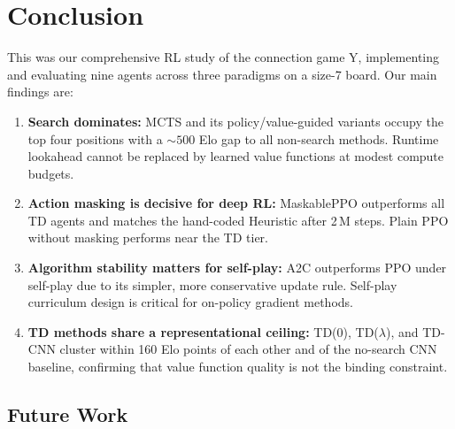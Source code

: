 \documentclass[conference]{IEEEtran}
\begin{document}
\section{Conclusion}

This was our comprehensive RL study of the connection game Y,
implementing and evaluating nine agents across three paradigms on a size-7 board.
Our main findings are:

\begin{enumerate}
  \item \textbf{Search dominates:} MCTS and its policy/value-guided variants
    occupy the top four positions with a ${\sim}500$ Elo gap to all non-search
    methods. Runtime lookahead cannot be replaced by learned value functions at
    modest compute budgets.
  \item \textbf{Action masking is decisive for deep RL:} MaskablePPO outperforms
    all TD agents and matches the hand-coded Heuristic after 2\,M steps.
    Plain PPO without masking performs near the TD tier.
  \item \textbf{Algorithm stability matters for self-play:} A2C outperforms PPO
    under self-play due to its simpler, more conservative update rule. Self-play
    curriculum design is critical for on-policy gradient methods.
  \item \textbf{TD methods share a representational ceiling:} TD(0), TD($\lambda$),
    and TD-CNN cluster within 160 Elo points of each other and of the no-search
    CNN baseline, confirming that value function quality is not the binding
    constraint.
\end{enumerate}

\subsection{Future Work}
\end{document}
